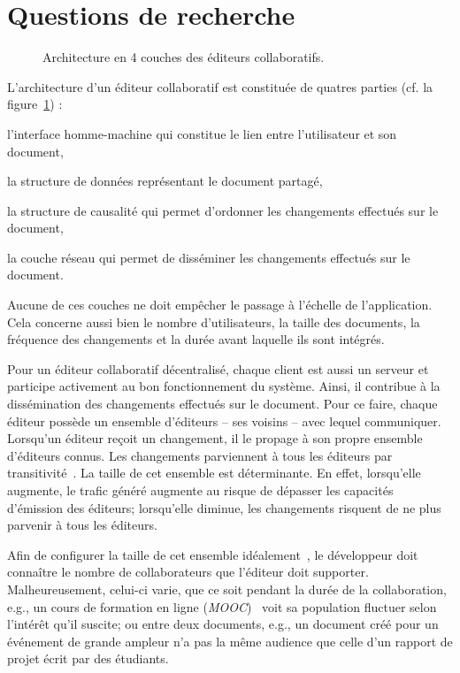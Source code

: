 
\section{Questions de recherche}

\begin{figure}
  \begin{center}
    
    \caption[Architecture des éditeurs collaboratifs]
    {\label{intro:fig:architecture} Architecture en 4 couches des éditeurs
      collaboratifs.}
  \end{center}
\end{figure}

L'architecture d'un éditeur collaboratif est constituée de quatres parties
(cf. la figure~\ref{intro:fig:architecture}) :
\begin{inparaenum}[(i)]
\item l'interface homme-machine qui constitue le lien entre l'utilisateur et son
  document, 
\item la structure de données représentant le document partagé,
\item la structure de causalité qui permet d'ordonner les changements effectués
  sur le document,
\item la couche réseau qui permet de disséminer les changements effectués sur le
  document.
\end{inparaenum}

Aucune de ces couches ne doit empêcher le passage à l'échelle de l'application.
Cela concerne aussi bien le nombre d'utilisateurs, la taille des documents, la
fréquence des changements et la durée avant laquelle ils sont intégrés.

Pour un éditeur collaboratif décentralisé, chaque client est aussi un serveur et
participe activement au bon fonctionnement du système. Ainsi, il contribue à la
dissémination des changements effectués sur le document. Pour ce faire, chaque
éditeur possède un ensemble d'éditeurs -- ses voisins -- avec lequel
communiquer. Lorsqu'un éditeur reçoit un changement, il le propage à son propre
ensemble d'éditeurs connus. Les changements parviennent à tous les éditeurs par
transitivité~\cite{birman1999bimodal}.  La taille de cet ensemble est
déterminante. En effet, lorsqu'elle augmente, le trafic généré augmente au
risque de dépasser les capacités d'émission des éditeurs; lorsqu'elle diminue,
les changements risquent de ne plus parvenir à tous les éditeurs.

Afin de configurer la taille de cet ensemble idéalement~\cite{erdos1959random},
le développeur doit connaître le nombre de collaborateurs que l'éditeur doit
supporter. Malheureusement, celui-ci varie, que ce soit pendant la durée de la
collaboration, e.g., un cours de formation en ligne
(\emph{MOOC})~\cite{breslow2013studying} voit sa population fluctuer selon
l'intérêt qu'il suscite; ou entre deux documents, e.g., un document créé pour un
événement de grande ampleur n'a pas la même audience que celle d'un rapport de
projet écrit par des étudiants.

